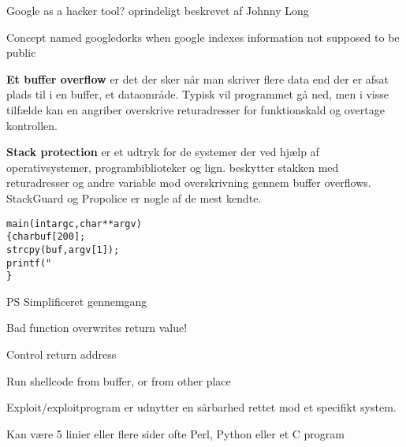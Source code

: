 \documentclass[20pt,landscape,a4paper,footrule]{foils}
\begin{document}

\begin{list1}
\item Google as a hacker tool? oprindeligt beskrevet af Johnny Long
\item Concept named googledorks when google indexes information not supposed to be public
\end{list1}


\begin{list1}
\item {\bfseries Et buffer overflow}
er det der sker når man skriver flere data end der er afsat plads til
i en buffer, et dataområde. Typisk vil programmet gå ned, men i visse
tilfælde kan en angriber overskrive returadresser for funktionskald og
overtage kontrollen.
\item {\bfseries Stack protection}
er et udtryk for de systemer der ved hjælp af operativsystemer,
programbiblioteker og lign. beskytter stakken med returadresser og
andre variable mod overskrivning gennem buffer overflows. StackGuard
og Propolice er nogle af de mest kendte.
\end{list1}



\begin{alltt}
main(int argc, char **argv)
\{      char buf[200];
        strcpy(buf, argv[1]);
        printf("%s\textbackslash{}n",buf);
\}
\end{alltt}


PS Simplificeret gennemgang




\begin{list1}
\item Bad function overwrites return value!
\item Control return address
\item Run shellcode from buffer, or from other place
\end{list1}



\begin{list2}
\item Exploit/exploitprogram er udnytter en sårbarhed rettet mod et specifikt system.
\item Kan være 5 linier eller flere sider ofte Perl, Python eller et C program
\end{list2}
\end{document}
